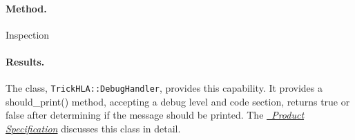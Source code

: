\paragraph{Method.} Inspection
\paragraph{Results.}
The class, {\tt TrickHLA::DebugHandler}, provides this capability. It provides a
should\_print() method, accepting a debug level and code section, returns true
or false after determining if the message should be printed.
The \href{file:TrickHLASpec.pdf} {\em \TrickHLA\ Product Specification}
discusses this class in detail.
